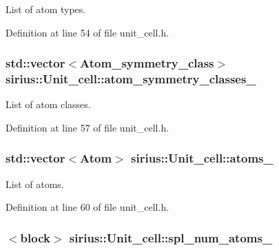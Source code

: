 List of atom types. 



Definition at line 54 of file unit\+\_\+cell.\+h.

\hypertarget{classsirius_1_1_unit__cell_a3e78840bc6c66018adaf378969a9dca5}{}
\subsubsection[{atom\+\_\+symmetry\+\_\+classes\+\_\+}]{\setlength{\rightskip}{0pt plus 5cm}std\+::vector$<${\bf Atom\+\_\+symmetry\+\_\+class}$>$ sirius\+::\+Unit\+\_\+cell\+::atom\+\_\+symmetry\+\_\+classes\+\_\+\hspace{0.3cm}{\ttfamily [private]}}\label{classsirius_1_1_unit__cell_a3e78840bc6c66018adaf378969a9dca5}


List of atom classes. 



Definition at line 57 of file unit\+\_\+cell.\+h.

\hypertarget{classsirius_1_1_unit__cell_a352195243de155d84e9768cb9dd42a53}{}
\subsubsection[{atoms\+\_\+}]{\setlength{\rightskip}{0pt plus 5cm}std\+::vector$<${\bf Atom}$>$ sirius\+::\+Unit\+\_\+cell\+::atoms\+\_\+\hspace{0.3cm}{\ttfamily [private]}}\label{classsirius_1_1_unit__cell_a352195243de155d84e9768cb9dd42a53}


List of atoms. 



Definition at line 60 of file unit\+\_\+cell.\+h.

\hypertarget{classsirius_1_1_unit__cell_a384eb0052909c0ed468eed0685aef448}{}
\subsubsection[{spl\+\_\+num\+\_\+atoms\+\_\+}]{$<$block$>$ sirius\+::\+Unit\+\_\+cell\+::spl\+\_\+num\+\_\+atoms\+\_\+\hspace{0.3cm}{\ttfamily [private]}}\label{classsirius_1_1_unit__cell_a384eb0052909c0ed468eed0685aef448}


